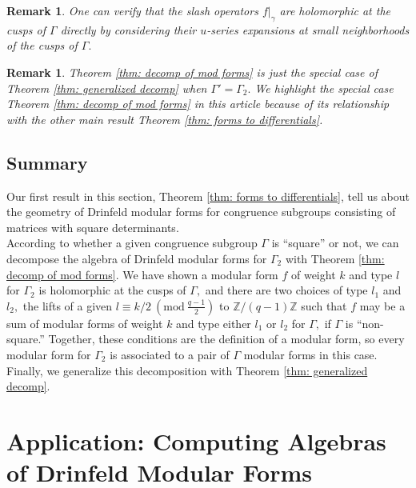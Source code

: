\documentclass[11pt]{amsart}
\newtheorem{remark}[theorem]{Remark}
\theoremstyle{definition}
\numberwithin{equation}{section}
\newcommand{\bbZ}{\mathbb{Z}}		%
\newcommand{\Mod}[1]{\ (\mathrm{mod}\ #1)}
\begin{document}
\begin{remark}
	One can verify that the slash operators $f|_{\gamma}$ are holomorphic at the cusps of $\Gamma$ directly by considering their $u$-series expansions at small neighborhoods of the cusps of $\Gamma.$
\end{remark}

\begin{remark}
	Theorem \ref{thm: decomp of mod forms} is just the special case of Theorem \ref{thm: generalized decomp} when $\Gamma'=\Gamma_2.$ We highlight the special case Theorem \ref{thm: decomp of mod forms} in this article because of its relationship with the other main result Theorem \ref{thm: forms to differentials}.
\end{remark}

\subsection{Summary}
Our first result in this section, Theorem \ref{thm: forms to differentials}, tell us about the geometry of Drinfeld modular forms for congruence subgroups consisting of matrices with square determinants.\\ 

According to whether a given congruence subgroup $\Gamma$ is ``square'' or not, we can decompose the algebra of Drinfeld modular forms for $\Gamma_2$ with Theorem \ref{thm: decomp of mod forms}.
We have shown a modular form $f$ of weight $k$ and type $l$ for $\Gamma_2$ is holomorphic at the cusps of $\Gamma,$ and there are two choices of type $l_1$ and $l_2,$ the lifts of a given $\displaystyle{l\equiv k/2\Mod{\frac{q-1}{2}}}$ to $\bbZ/(q-1)\bbZ$ such that $f$ may be a sum of modular forms of weight $k$ and type either $l_1$ or $l_2$ for $\Gamma,$ if $\Gamma$ is ``non-square.'' Together, these conditions are the definition of a modular form, so every modular form for $\Gamma_2$ is associated to a pair of $\Gamma$ modular forms in this case. Finally, we generalize this decomposition with Theorem \ref{thm: generalized decomp}.

\section{Application: Computing Algebras of Drinfeld Modular Forms}
\end{document}
